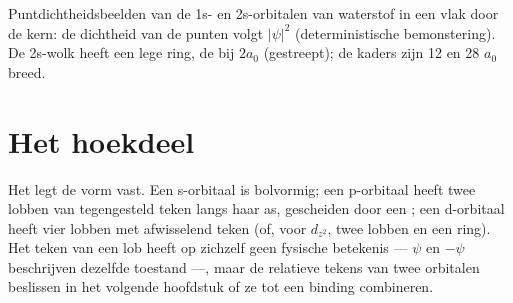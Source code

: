 \begin{omfigure}
\hspace{0.12\linewidth}%

{\small Puntdichtheidsbeelden van de 1s- en 2s-orbitalen van waterstof in een vlak
door de kern: de dichtheid van de punten volgt $|\psi|^2$ (deterministische
bemonstering). De 2s-wolk heeft een lege ring, de  bij $2a_0$ (gestreept);
de kaders zijn 12 en 28 $a_0$ breed.}
\end{omfigure}

\section{Het hoekdeel}

Het  legt de vorm vast. Een s-orbitaal is bolvormig; een p-orbitaal heeft twee
lobben van tegengesteld teken langs haar as, gescheiden door een ; een d-orbitaal heeft
vier lobben met afwisselend teken (of, voor $d_{z^2}$, twee lobben en een ring). Het teken
van een lob heeft op zichzelf geen fysische betekenis --- $\psi$ en $-\psi$ beschrijven dezelfde
toestand ---, maar de relatieve tekens van twee orbitalen beslissen in het volgende hoofdstuk
of ze tot een binding combineren.

